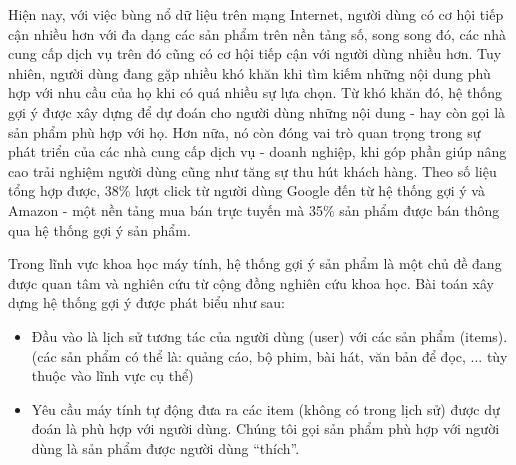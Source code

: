 


Hiện nay, với việc bùng nổ dữ liệu trên mạng Internet, người dùng có cơ hội tiếp cận
nhiều hơn với đa dạng các sản phẩm trên nền tảng số, song song đó,
các nhà cung cấp dịch vụ trên đó cũng có cơ hội tiếp cận với người dùng nhiều hơn. %
Tuy nhiên, người dùng đang gặp nhiều khó khăn khi tìm kiếm những nội dung phù hợp với nhu cầu của họ khi có quá nhiều sự lựa chọn.
Từ khó khăn đó, hệ thống gợi ý được xây dựng để dự đoán cho người dùng những nội dung - hay còn gọi là sản phẩm phù hợp với họ.
Hơn nữa, nó còn đóng vai trò quan trọng trong sự phát triển của các nhà cung cấp dịch vụ - doanh nghiệp,
khi góp phần giúp nâng cao trải nghiệm người dùng cũng như tăng sự thu hút khách hàng. Theo số liệu tổng hợp được, 
38\% lượt click từ người dùng Google đến từ hệ thống gợi ý và 
Amazon - một nền tảng mua bán trực tuyến mà 35\% sản phẩm được bán thông qua hệ thống gợi ý sản phẩm.

Trong lĩnh vực khoa học máy tính, hệ thống gợi ý sản phẩm là một chủ đề 
đang được quan tâm và nghiên cứu từ cộng đồng nghiên cứu khoa học.
Bài toán xây dựng hệ thống gợi ý được phát biểu như sau:
\begin{itemize}
    \item Đầu vào là lịch sử tương tác của người dùng (user) với các sản phẩm (items). 
    (các sản phẩm có thể là: quảng cáo, bộ phim, bài hát, văn bản để đọc, ... tùy thuộc vào lĩnh vực cụ thể)
    \item Yêu cầu máy tính tự động đưa ra các item (không có trong lịch sử) được dự đoán là phù hợp với người dùng.
    Chúng tôi gọi sản phẩm phù hợp với người dùng là sản phẩm được người dùng ``thích''.
\end{itemize}

